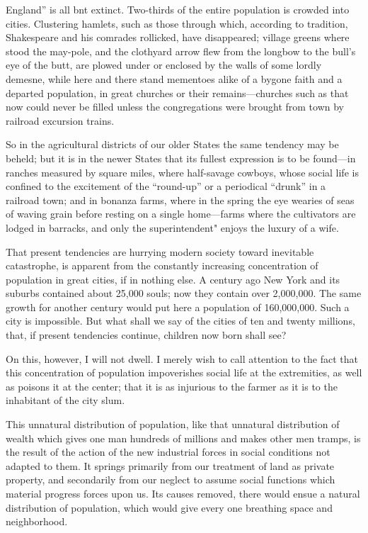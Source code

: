 \documentclass{book}
\begin{document}
England” is all bnt extinct. Two-thirds of the entire population is crowded into cities. Clustering hamlets, such as those through which, according to tradition, Shakespeare and his comrades rollicked, have disappeared; village greens where stood the may-pole, and the clothyard arrow flew from the longbow to the bull’s eye of the butt, are plowed under or enclosed by the walls of some lordly demesne, while here and there stand mementoes alike of a bygone faith and a departed population, in great churches or their remains—churches such as that now could never be filled unless the congregations were brought from town by railroad excursion trains.

So in the agricultural districts of our older States the same tendency may be beheld; but it is in the newer States that its fullest expression is to be found—in ranches measured by square miles, where half-savage cowboys, whose social life is confined to the excitement of the “round-up” or a periodical “drunk” in a railroad town; and in bonanza farms, where in the spring the eye wearies of seas of waving grain before resting on a single home—farms where the cultivators are lodged in barracks, and only the superintendent" enjoys the luxury of a wife.

That present tendencies are hurrying modern society toward inevitable catastrophe, is apparent from the constantly increasing concentration of population in great cities, if in nothing else. A century ago New York and its suburbs contained about 25,000 souls; now they contain over 2,000,000. The same growth for another century would put here a population of 160,000,000. Such a city is impossible. But what shall we say of the cities of ten and twenty millions, that, if present tendencies continue, children now born shall see?

On this, however, I will not dwell. I merely wish to call attention to the fact that this concentration of population impoverishes social life at the extremities, as well as poisons it at the center; that it is as injurious to the farmer as it is to the inhabitant of the city slum.

This unnatural distribution of population, like that unnatural distribution of wealth which gives one man hundreds of millions and makes other men tramps, is the result of the action of the new industrial forces in social conditions not adapted to them. It springs primarily from our treatment of land as private property, and secondarily from our neglect to assume social functions which material progress forces upon us. Its causes removed, there would ensue a natural distribution of population, which would give every one breathing space and neighborhood.
\end{document}
